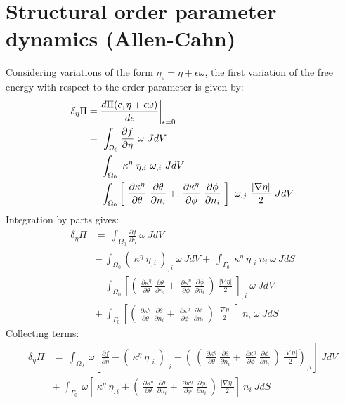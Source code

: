 \section{Structural order parameter dynamics (Allen-Cahn)}
Considering variations of the form $\eta_{\epsilon} = \eta + \epsilon \omega$, the first variation of the free energy with respect to the order parameter is given by:
\begin{align}
\delta_{\eta}\Pi &= \frac{d \Pi(c, \eta + \epsilon \omega)}{d\epsilon} \bigg|_{\epsilon=0} \notag  \nonumber \\
  &= ~\int_{\Omega_0}  \frac{\partial f}{\partial \eta}~\omega ~J dV  \nonumber \\
  &+ ~\int_{\Omega_0}  ~\kappa^\eta~\eta_{,i}~\omega_{,i} ~J dV  \nonumber \\
  &+ ~\int_{\Omega_0}  \left[ ~\frac{\partial \kappa^\eta}{\partial \theta}  ~\frac{\partial \theta}{\partial n_i} +  ~\frac{\partial \kappa^\eta}{\partial \phi} ~\frac{\partial \phi}{\partial n_i} ~\right] ~\omega_{,j} ~\frac{|\nabla \eta|}{2} ~J dV 
\end{align}
Integration by parts gives:
\begin{align}
\delta_{\eta}\Pi &= ~\int_{\Omega_0}  \frac{\partial f}{\partial \eta}~\omega ~J dV  \nonumber \\
  &- ~\int_{\Omega_0}  \left(~\kappa^\eta~\eta_{,i}~\right)_{,i} ~\omega ~J dV + ~\int_{\Gamma_0} ~\kappa^\eta~\eta_{,i} ~n_{i} ~\omega ~J dS  \nonumber \\
  &- ~\int_{\Omega_0}  \left[ \left( ~\frac{\partial \kappa^\eta}{\partial \theta} ~\frac{\partial \theta}{\partial n_i} +  ~\frac{\partial \kappa^\eta}{\partial \phi} ~\frac{\partial \phi}{\partial n_i} ~\right) ~\frac{|\nabla \eta|}{2} ~\right]_{,i} ~\omega ~J dV  \nonumber \\
  &+ ~\int_{\Gamma_0}  \left[ \left( ~\frac{\partial \kappa^\eta}{\partial \theta} ~\frac{\partial \theta}{\partial n_i} +  ~\frac{\partial \kappa^\eta}{\partial \phi} ~\frac{\partial \phi}{\partial n_i} ~\right) ~\frac{|\nabla \eta|}{2} ~\right] ~n_{i} ~\omega ~J dS 
\end{align}
Collecting terms:
\begin{align}
\delta_{\eta}\Pi &= ~\int_{\Omega_0}  ~\omega \left[\frac{\partial f}{\partial \eta} - \left(~\kappa^\eta~\eta_{,i}~\right)_{,i} - \left( ~\left(~\frac{\partial \kappa^\eta}{\partial \theta} ~\frac{\partial \theta}{\partial n_i} +  ~\frac{\partial \kappa^\eta}{\partial \phi} ~\frac{\partial \phi}{\partial n_i} ~\right) ~\frac{|\nabla \eta|}{2} \right)_{,i}  \right] ~J dV  \nonumber \\
  &+ ~\int_{\Gamma_0} ~\omega \left[ ~\kappa^\eta~\eta_{,i}  + \left( ~\frac{\partial \kappa^\eta}{\partial \theta} ~\frac{\partial \theta}{\partial n_i} +  ~\frac{\partial \kappa^\eta}{\partial \phi} ~\frac{\partial \phi}{\partial n_i} ~\right) ~\frac{|\nabla \eta|}{2}  \right] ~n_{i} ~J dS
\end{align}
